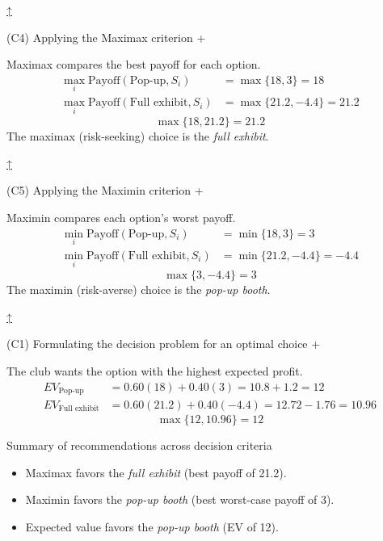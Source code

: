 \documentclass[11pt]{article}
\begin{document}
	
	
	
	\hyperref[problem6-criteria]{↑}
	
	
	
	
	(C4) Applying the Maximax criterion
	+
	
	
	Maximax compares the best payoff for each option.
	\[
	\begin{aligned}
		\max_i \text{Payoff}(\text{Pop-up}, S_i) &= \max\{18, 3\} = 18 \\
		\max_i \text{Payoff}(\text{Full exhibit}, S_i) &= \max\{21.2, -4.4\} = 21.2
	\end{aligned}
	\]
	\[
	\max\{18, 21.2\} = 21.2
	\]
	The maximax (risk-seeking) choice is the \emph{full exhibit}.
	
	
	\hyperref[problem6-criteria]{↑}
	
	
	
	
	(C5) Applying the Maximin criterion
	+
	
	
	Maximin compares each option's worst payoff.
	\[
	\begin{aligned}
		\min_i \text{Payoff}(\text{Pop-up}, S_i) &= \min\{18, 3\} = 3 \\
		\min_i \text{Payoff}(\text{Full exhibit}, S_i) &= \min\{21.2, -4.4\} = -4.4
	\end{aligned}
	\]
	\[
	\max\{3, -4.4\} = 3
	\]
	The maximin (risk-averse) choice is the \emph{pop-up booth}.
	
	
	\hyperref[problem6-criteria]{↑}
	
	
	
	
	(C1) Formulating the decision problem for an optimal choice
	+
	
	
	The club wants the option with the highest expected profit.
	\[
	\begin{aligned}
		EV_{\text{Pop-up}} &= 0.60(18) + 0.40(3) = 10.8 + 1.2 = 12 \\
		EV_{\text{Full exhibit}} &= 0.60(21.2) + 0.40(-4.4) = 12.72 - 1.76 = 10.96
	\end{aligned}
	\]
	\[
	\max\{12, 10.96\} = 12
	\]
	
	Summary of recommendations across decision criteria
	\begin{itemize}
		\item Maximax favors the \emph{full exhibit} (best payoff of 21.2).
		\item Maximin favors the \emph{pop-up booth} (best worst-case payoff of 3).
		\item Expected value favors the \emph{pop-up booth} (EV of 12).
	\end{itemize}
	
\end{document}
